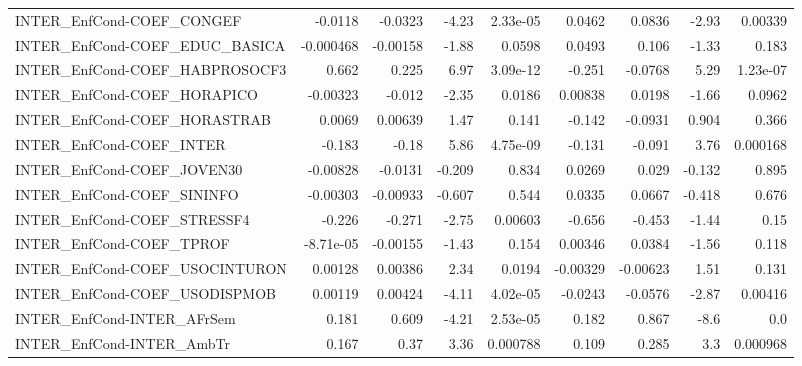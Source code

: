 \begin{tabular}{lrrrrrrrr}
INTER\_EnfCond-COEF\_CONGEF              &     -0.0118 &      -0.0323 &    -4.23 & 2.33e-05 &     0.0462 &      0.0836 &        -2.93 &       0.00339 \\
INTER\_EnfCond-COEF\_EDUC\_BASICA         &   -0.000468 &     -0.00158 &    -1.88 &   0.0598 &     0.0493 &       0.106 &        -1.33 &         0.183 \\
INTER\_EnfCond-COEF\_HABPROSOCF3         &       0.662 &        0.225 &     6.97 & 3.09e-12 &     -0.251 &     -0.0768 &         5.29 &      1.23e-07 \\
INTER\_EnfCond-COEF\_HORAPICO            &    -0.00323 &       -0.012 &    -2.35 &   0.0186 &    0.00838 &      0.0198 &        -1.66 &        0.0962 \\
INTER\_EnfCond-COEF\_HORASTRAB           &      0.0069 &      0.00639 &     1.47 &    0.141 &     -0.142 &     -0.0931 &        0.904 &         0.366 \\
INTER\_EnfCond-COEF\_INTER               &      -0.183 &        -0.18 &     5.86 & 4.75e-09 &     -0.131 &      -0.091 &         3.76 &      0.000168 \\
INTER\_EnfCond-COEF\_JOVEN30             &    -0.00828 &      -0.0131 &   -0.209 &    0.834 &     0.0269 &       0.029 &       -0.132 &         0.895 \\
INTER\_EnfCond-COEF\_SININFO             &    -0.00303 &     -0.00933 &   -0.607 &    0.544 &     0.0335 &      0.0667 &       -0.418 &         0.676 \\
INTER\_EnfCond-COEF\_STRESSF4            &      -0.226 &       -0.271 &    -2.75 &  0.00603 &     -0.656 &      -0.453 &        -1.44 &          0.15 \\
INTER\_EnfCond-COEF\_TPROF               &   -8.71e-05 &     -0.00155 &    -1.43 &    0.154 &    0.00346 &      0.0384 &        -1.56 &         0.118 \\
INTER\_EnfCond-COEF\_USOCINTURON         &     0.00128 &      0.00386 &     2.34 &   0.0194 &   -0.00329 &    -0.00623 &         1.51 &         0.131 \\
INTER\_EnfCond-COEF\_USODISPMOB          &     0.00119 &      0.00424 &    -4.11 & 4.02e-05 &    -0.0243 &     -0.0576 &        -2.87 &       0.00416 \\
INTER\_EnfCond-INTER\_AFrSem             &       0.181 &        0.609 &    -4.21 & 2.53e-05 &      0.182 &       0.867 &         -8.6 &           0.0 \\
INTER\_EnfCond-INTER\_AmbTr              &       0.167 &         0.37 &     3.36 & 0.000788 &      0.109 &       0.285 &          3.3 &      0.000968 \\

\end{tabular}
